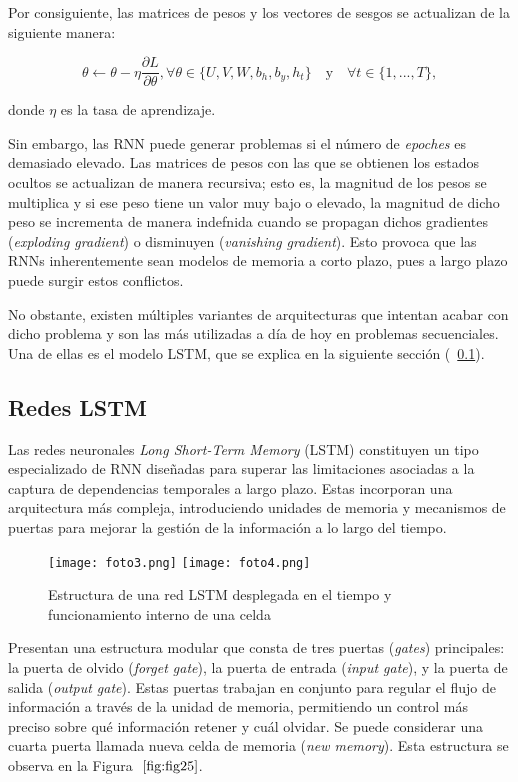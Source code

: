 \documentclass[12pt,twoside]{article}
\begin{document}
Por consiguiente, las matrices de pesos y los vectores de sesgos se actualizan de la siguiente manera: 

\begin{equation}
\theta \leftarrow \theta - \eta  \frac{\partial L}{\partial \theta}, \forall \theta \in \{U,V,W,b_h,b_y, h_t \} \text{  }\text{ y }\text{  } \forall t \in \{ 1,...,T\},
\end{equation}

donde $\eta$ es la tasa de aprendizaje.

Sin embargo, las RNN puede generar problemas si el número de \textit{epoches} es demasiado elevado. Las matrices de pesos con las que se obtienen los estados ocultos se actualizan de manera recursiva; esto es, la magnitud de los pesos se multiplica y si ese peso tiene un valor muy bajo o elevado, la magnitud de dicho peso se incrementa de manera indefnida cuando se propagan dichos gradientes (\textit{exploding gradient}) o disminuyen (\textit{vanishing gradient}). Esto provoca que las RNNs inherentemente sean modelos de memoria a corto plazo, pues a largo plazo puede surgir estos conflictos.

No obstante, existen múltiples variantes de arquitecturas que intentan acabar con dicho problema y son las más utilizadas a día de hoy en problemas secuenciales. Una de ellas es el modelo LSTM, que se explica en la siguiente sección (~\ref{sec:17}).


\subsection{Redes LSTM}\label{sec:17}

Las redes neuronales \textit{Long Short-Term Memory} (LSTM) constituyen un tipo especializado de RNN diseñadas para superar las limitaciones asociadas a la captura de dependencias temporales a largo plazo. Estas incorporan una arquitectura más compleja, introduciendo unidades de memoria y mecanismos de puertas para mejorar la gestión de la información a lo largo del tiempo.

\begin{figure}[h]
    \centering
    \texttt{[image: foto3.png]}
    \texttt{[image: foto4.png]}
    \caption{Estructura de una red LSTM desplegada en el tiempo y funcionamiento interno de una celda} 
    \label{fig:fig25}
\end{figure}


Presentan una estructura modular que consta de tres puertas (\textit{gates}) principales: la puerta de olvido (\textit{forget gate}), la puerta de entrada (\textit{input gate}), y la puerta de salida (\textit{output gate}). Estas puertas trabajan en conjunto para regular el flujo de información a través de la unidad de memoria, permitiendo un control más preciso sobre qué información retener y cuál olvidar. Se puede considerar una cuarta puerta llamada nueva celda de memoria (\textit{new memory}). Esta estructura se observa en la Figura $~\ref{fig:fig25}$.
\end{document}
